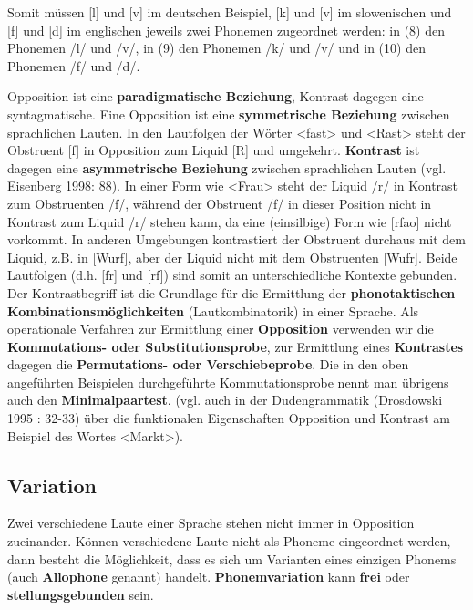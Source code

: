 \documentclass[
  letterpaper,
]{scrbook}
\begin{document}
Somit müssen {[}l{]} und {[}v{]} im deutschen Beispiel, {[}k{]} und
{[}v{]} im slowenischen und {[}f{]} und {[}d{]} im englischen jeweils
zwei Phonemen zugeordnet werden: in (8) den Phonemen /l/ und /v/, in (9)
den Phonemen /k/ und /v/ und in (10) den Phonemen /f/ und /d/.

Opposition ist eine \textbf{paradigmatische Beziehung}, Kontrast dagegen
eine syntagmatische. Eine Opposition ist eine \textbf{symmetrische
Beziehung} zwischen sprachlichen Lauten. In den Lautfolgen der Wörter
\textless fast\textgreater{} und \textless Rast\textgreater{} steht der
Obstruent {[}f{]} in Opposition zum Liquid {[}R{]} und umgekehrt.
\textbf{Kontrast} ist dagegen eine \textbf{asymmetrische Beziehung}
zwischen sprachlichen Lauten (vgl. Eisenberg 1998: 88). In einer Form
wie \textless Frau\textgreater{} steht der Liquid /r/ in Kontrast zum
Obstruenten /f/, während der Obstruent /f/ in dieser Position nicht in
Kontrast zum Liquid /r/ stehen kann, da eine (einsilbige) Form wie
{[}rfao{]} nicht vorkommt. In anderen Umgebungen kontrastiert der
Obstruent durchaus mit dem Liquid\emph{,} z.B. in {[}Wurf{]}, aber der
Liquid nicht mit dem Obstruenten {[}Wufr{]}. Beide Lautfolgen (d.h.
{[}fr{]} und {[}rf{]}) sind somit an unterschiedliche Kontexte gebunden.
Der Kontrastbegriff ist die Grundlage für die Ermittlung der
\textbf{phonotaktischen Kombinationsmöglichkeiten} (Lautkombinatorik) in
einer Sprache. Als operationale Verfahren zur Ermittlung einer
\textbf{Opposition} verwenden wir die \textbf{Kommutations- oder
Substitutionsprobe}, zur Ermittlung eines \textbf{Kontrastes} dagegen
die \textbf{Permutations- oder Verschiebeprobe}. Die in den oben
angeführten Beispielen durchgeführte Kommutationsprobe nennt man
übrigens auch den \textbf{Minimalpaartest}. (vgl. auch in der
Dudengrammatik (Drosdowski 1995 : 32-33) über die funktionalen
Eigenschaften Opposition und Kontrast am Beispiel des Wortes
\textless Markt\textgreater).

\hypertarget{variation}{%
\subsection{Variation}\label{variation}}

Zwei verschiedene Laute einer Sprache stehen nicht immer in Opposition
zueinander. Können verschiedene Laute nicht als Phoneme eingeordnet
werden, dann besteht die Möglichkeit, dass es sich um Varianten eines
einzigen Phonems (auch \textbf{Allophone} genannt) handelt.
\textbf{Phonemvariation} kann \textbf{frei} oder
\textbf{stellungsgebunden} sein.
\end{document}
